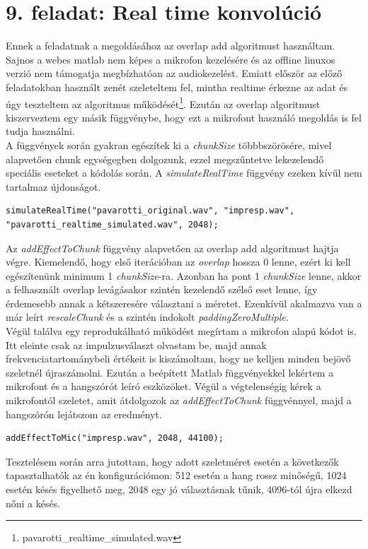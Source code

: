 \documentclass{article}
\begin{document}
\section*{9. feladat: Real time konvolúció}
	Ennek a feladatnak a megoldásához az overlap add algoritmust használtam. Sajnos a webes matlab nem képes a mikrofon kezelésére és az offline linuxos verzió nem támogatja megbízhatóan az audiokezelést. Emiatt először az előző feladatokban használt zenét szeleteltem fel, mintha realtime érkezne az adat és úgy teszteltem az algoritmus működését\footnote{pavarotti\_realtime\_simulated.wav}. Ezután az overlap algoritmust kiszerveztem egy másik függvénybe, hogy ezt a mikrofont használó megoldás is fel tudja használni. \\
	A függvények során gyakran egészítek ki a \textit{chunkSize} többbszörösére, mivel alapvetően chunk egységegben dolgozunk, ezzel megszűntetve lekezelendő speciális eseteket a kódolás során. A \textit{simulateRealTime} függvény ezeken kívűl nem tartalmaz újdonságot.
	\begin{lstlisting}
simulateRealTime("pavarotti_original.wav", "impresp.wav", "pavarotti_realtime_simulated.wav", 2048);
	\end{lstlisting}
	
	Az \textit{addEffectToChunk} függvény alapvetően az overlap add algoritmust hajtja végre. Kiemelendő, hogy első iterációban az \textit{overlap} hossza $0$ lenne, ezért ki kell egészítenünk minimum 1 \textit{chunkSize}-ra. Azonban ha pont 1 \textit{chunkSize} lenne, akkor a felhasznált overlap levágásakor szintén kezelendő szélső eset lenne, így érdemesebb annak a kétszeresére választani a méretet. Ezenkívül akalmazva van a már leírt \textit{rescaleChunk} és a szintén indokolt \textit{paddingZeroMultiple}. \\
	
	Végül találva egy reprodukálható működést megírtam a mikrofon alapú kódot is. Itt eleinte csak az impulzusválaszt olvastam be, majd annak frekvenciatartománybeli értékeit is kiszámoltam, hogy ne kelljen minden bejövő szeletnél újraszámolni. Ezután a beépített Matlab függvényekkel lekértem a mikrofont és a hangszórót leíró eszközöket. Végül a végtelenségig kérek a mikrofontól szeletet, amit átdolgozok az \textit{addEffectToChunk} függvénnyel, majd a hangszórón lejátszom az eredményt.
	\begin{lstlisting}
addEffectToMic("impresp.wav", 2048, 44100);
	\end{lstlisting}
	
	Tesztelésem során arra jutottam, hogy adott szeletméret esetén a következők tapasztalhatók az én konfigurációmon: 512 esetén a hang rossz minőségű, 1024 esetén késés figyelhető meg, 2048 egy jó választásnak tűnik, 4096-tól újra elkezd nőni a késés.

\end{document}
